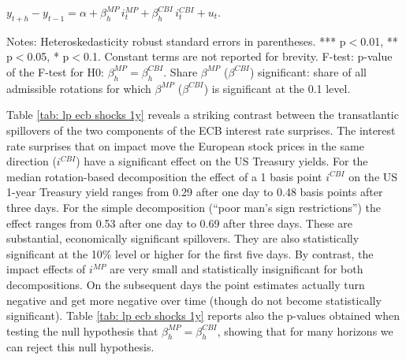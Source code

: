 \documentclass[a4paper,12pt]{article}
\newcommand{\pathTables}{../workm_lp/}
\begin{document}
\begin{table}[!htbp]
\begin{center}
\caption{The effect of ECB monetary policy and information shocks on US Treasury yields for other rotations}\label{tab: lp ecb shocks 1y pctiles}
$y^{}_{t+h}-y^{}_{t-1} = \alpha + \beta^{MP}_h\, i^{MP}_t + \beta^{CBI}_h\, i^{CBI}_t + u_t.$
\small
{}
\end{center}\footnotesize
Notes: Heteroskedasticity robust standard errors in parentheses. *** p$<$0.01, ** p$<$0.05, * p$<$0.1.
Constant terms are not reported for brevity.
F-test: p-value of the F-test for H0: $\beta^{MP}_h=\beta^{CBI}_h$.
Share $\beta^{MP}$ ($\beta^{CBI}$) significant: share of all admissible rotations for which $\beta^{MP}$ ($\beta^{CBI}$) is significant at the 0.1 level.
\end{table}

Table \ref{tab: lp ecb shocks 1y} reveals a striking contrast between the transatlantic spillovers
of the two components of the ECB interest rate surprises.
The interest rate surprises
that on impact move the European stock prices in the same direction ($i^{CBI}$) have a significant effect
on the US Treasury yields. 
For the median rotation-based decomposition the effect of a 1 basis point $i^{CBI}$ on the US 1-year Treasury yield
ranges from 0.29 after one day to 0.48 basis points after three days. 
For the simple decomposition (``poor man's sign restrictions'') the effect ranges from 0.53 after one day to 0.69 after three days.
These are substantial, economically significant spillovers. They are also statistically significant at the 10\% level or higher for the first five days.
By contrast, the impact effects of $i^{MP}$ are very small and statistically insignificant for both decompositions. On the subsequent days the point estimates actually turn negative and get more negative over time (though do not become statistically significant).
Table \ref{tab: lp ecb shocks 1y} reports also the p-values obtained when testing
the null hypothesis that $\beta^{MP}_h=\beta^{CBI}_h$, showing that for many horizons we can
reject this null hypothesis.
\end{document}
